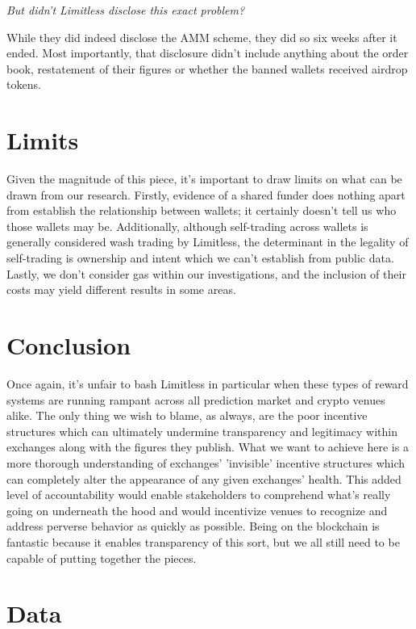 \documentclass[11pt]{article}
\begin{document}
\emph{But didn't Limitless disclose this exact problem?}

While they did indeed disclose the AMM scheme, they did so six weeks after it ended.
Most importantly, that disclosure didn't include anything about the order book, restatement of their figures or whether the banned wallets received airdrop tokens.

\section{Limits}

Given the magnitude of this piece, it's important to draw limits on what can be drawn from our research.
Firstly, evidence of a shared funder does nothing apart from establish the relationship between wallets; it certainly doesn't tell us who those wallets may be.
Additionally, although self-trading across wallets is generally considered wash trading by Limitless, the determinant in the legality of self-trading is ownership and intent which we can't establish from public data.
Lastly, we don't consider gas within our investigations, and the inclusion of their costs may yield different results in some areas.

\section{Conclusion}

Once again, it's unfair to bash Limitless in particular when these types of reward systems are running rampant across all prediction market and crypto venues alike.
The only thing we wish to blame, as always, are the poor incentive structures which can ultimately undermine transparency and legitimacy within exchanges along with the figures they publish.
What we want to achieve here is a more thorough understanding of exchanges' 'invisible' incentive structures which can completely alter the appearance of any given exchanges' health.
This added level of accountability would enable stakeholders to comprehend what's really going on underneath the hood and would incentivize venues to recognize and address perverse behavior as quickly as possible.
Being on the blockchain is fantastic because it enables transparency of this sort, but we all still need to be capable of putting together the pieces.

\section{Data}
\end{document}
